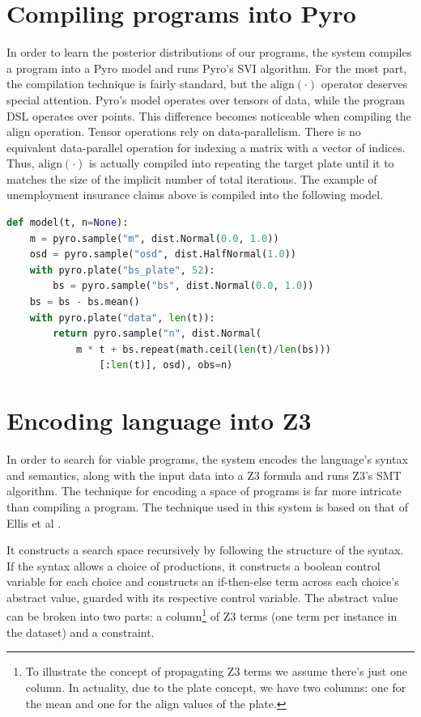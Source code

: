 \documentclass[letterpaper]{llncs}
\begin{document}
\section{Compiling programs into Pyro}
In order to learn the posterior distributions of our programs, the system compiles a program into  
a Pyro model and runs Pyro's SVI algorithm. For the most part, the compilation technique
is fairly standard, but the $\text{align}(\cdot)$ operator deserves special attention. 
Pyro's model operates over tensors of data, while the program DSL operates over points. 
This difference becomes noticeable when compiling the align operation. Tensor operations 
rely on data-parallelism. There is no
equivalent data-parallel operation for indexing a matrix with a vector of indices.
Thus, $\text{align}(\cdot)$ is actually compiled into repeating the target plate until it
to matches the size of the implicit number of total iterations.    
The example of unemployment insurance claims above is compiled into the following model.

\begin{lstlisting}[language=Python]
def model(t, n=None):
    m = pyro.sample("m", dist.Normal(0.0, 1.0))
    osd = pyro.sample("osd", dist.HalfNormal(1.0))
    with pyro.plate("bs_plate", 52):
        bs = pyro.sample("bs", dist.Normal(0.0, 1.0))
    bs = bs - bs.mean()
    with pyro.plate("data", len(t)):
        return pyro.sample("n", dist.Normal(
            m * t + bs.repeat(math.ceil(len(t)/len(bs)))
                [:len(t)], osd), obs=n)
\end{lstlisting}


\section{Encoding language into Z3}
In order to search for viable programs, the system encodes the language's syntax and semantics, 
along with the input data into a Z3 formula and runs Z3's SMT algorithm.
The technique for encoding a space of programs is far more intricate than compiling a program.
The technique used in this system is based on that of Ellis et al \cite{ellis}.

It constructs a search space recursively by following the structure of the syntax. 
If the syntax allows a choice of productions, it constructs a boolean control variable for each choice
and constructs an if-then-else term across each choice's abstract value, guarded with its respective control variable. 
The abstract value can be broken into two parts: a column\footnote{
To illustrate the concept of propagating Z3 terms we assume there's just one column.
In actuality, due to the plate concept, we have two columns: 
one for the mean and one for the align values of the plate.  
} of Z3 terms (one term per instance in the dataset) and a constraint.
\end{document}
